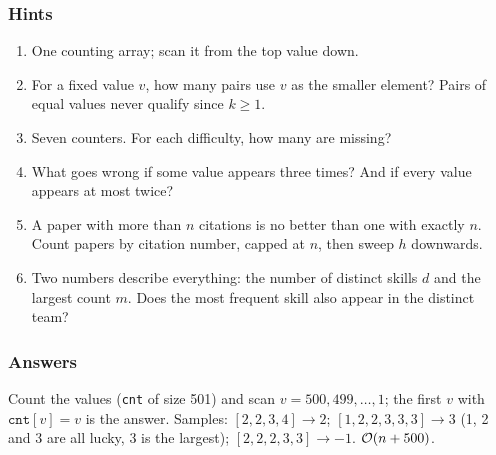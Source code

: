 \subsubsection*{Hints}
\begin{enumerate}[leftmargin=*, label=\textbf{E5.\arabic*}]
    \item One counting array; scan it from the top value down.
    \item For a fixed value $v$, how many pairs use $v$ as the smaller element? Pairs of equal values never qualify since $k \ge 1$.
    \item Seven counters. For each difficulty, how many are missing?
    \item What goes wrong if some value appears three times? And if every value appears at most twice?
    \item A paper with more than $n$ citations is no better than one with exactly $n$. Count papers by citation number, capped at $n$, then sweep $h$ downwards.
    \item Two numbers describe everything: the number of distinct skills $d$ and the largest count $m$. Does the most frequent skill also appear in the distinct team?
\end{enumerate}

\subsubsection*{Answers}

\begin{solutionbox}
Count the values (\texttt{cnt} of size 501) and scan $v = 500, 499, \dots, 1$; the first $v$ with $\texttt{cnt}[v] = v$ is the answer. Samples: $[2,2,3,4] \to 2$; $[1,2,2,3,3,3] \to 3$ (1, 2 and 3 are all lucky, 3 is the largest); $[2,2,2,3,3] \to -1$. $\mathcal{O}(n + 500)$.
\end{solutionbox}

